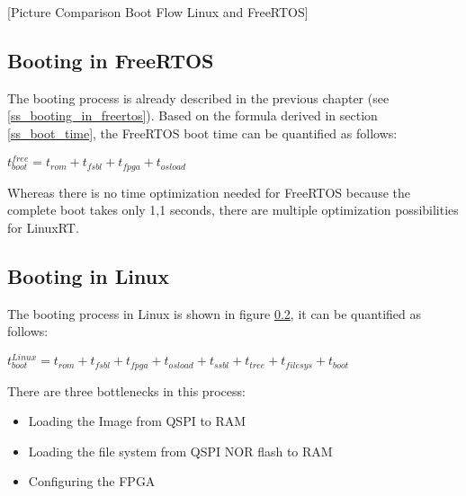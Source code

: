 [Picture Comparison Boot Flow Linux and FreeRTOS] 

\subsection{Booting in FreeRTOS}
The booting process is already described in the previous chapter (see \ref{ss_booting_in_freertos}).
Based on the formula derived in section \ref{ss_boot_time}, the FreeRTOS boot time can be quantified as follows:
\par
$t_{boot}^{free} = t_{rom} + t_{fsbl} +  t_{fpga} + t_{osload} $
\par
Whereas there is no time optimization needed for FreeRTOS because the complete boot takes only 1,1 seconds, there are multiple optimization possibilities for LinuxRT. 

\subsection{Booting in Linux}
The booting process in Linux is shown in figure \ref{}, it can be quantified as follows:
\par
$t_{boot}^{Linux} = t_{rom} + t_{fsbl} +  t_{fpga} + t_{osload} +  t_{ssbl} + t_{tree} + t_{filesys} + t_{boot}$
\par
There are three bottlenecks in this process:
\begin{itemize}
	\item Loading the Image from \ac{QSPI} to \ac{RAM}
	\item Loading the file system from \ac{QSPI} NOR flash to \ac{RAM}
	\item Configuring the \ac{FPGA}
\end{itemize}

